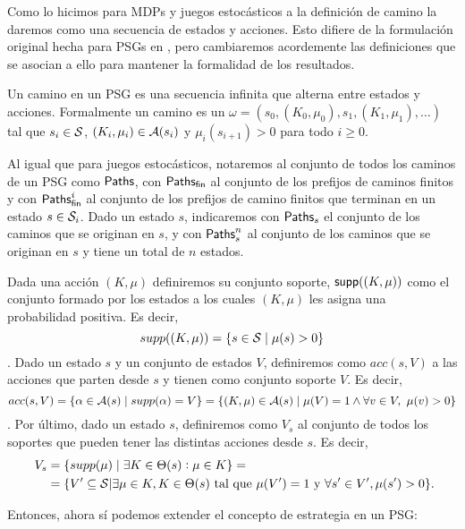 Como lo hicimos para MDPs y juegos estocásticos a la definición de camino la
daremos como una secuencia de estados y acciones. Esto difiere de la
formulación original hecha para PSGs en \cite{Polytopal}, pero cambiaremos
acordemente las definiciones que se asocian a ello para mantener la formalidad
de los resultados.

\begin{definition}
	Un camino en un PSG es una secuencia infinita que alterna entre estados y acciones. Formalmente un camino es un $\omega = (s_0, (K_0, \mu_0), s_1, (K_1, \mu_1), \dots)$ tal que $s_i \in \mathcal{S}$, $(K_i, \mu_i) \in \mathcal{A}(s_i)$ y $\mu_i(s_{i+1}) > 0$ para todo $i \geq 0$.

	Al igual que para juegos estocásticos, notaremos al conjunto de todos los
	caminos de un PSG como $\textsf{Paths}$, con $\textsf{Paths}_\textsf{fin}$ al conjunto de los prefijos de
	caminos finitos y con $\textsf{Paths}_\textsf{fin}^i$ al conjunto de los prefijos de camino
	finitos que terminan en un estado $s \in \mathcal{S}_i$. Dado un estado $s$,
	indicaremos con $\textsf{Paths}_s$ el conjunto de los caminos que se originan en $s$, y
	con $\textsf{Paths}_s^n$ al conjunto de los caminos que se originan en $s$ y tiene un
	total de $n$ estados.
\end{definition}

\begin{definition}
	Dada una acción $(K, \mu)$ definiremos su conjunto soporte, $\textsf{supp}((K, \mu))$ como el conjunto formado por los estados a los cuales $(K, \mu)$ les asigna una probabilidad positiva. Es decir,
	$$supp((K, \mu)) = \{s \in \mathcal{S} \mid \mu(s) > 0\}$$.
	Dado un estado $s$ y un conjunto de estados $V$, definiremos como $acc(s, V)$ a
	las acciones que parten desde $s$ y tienen como conjunto soporte $V$. Es decir,
	$$acc(s, V) = \{\alpha \in \mathcal{A}(s) \mid supp(\alpha) = V\} = \{(K, \mu) \in \mathcal{A}(s) \mid \mu(V) = 1 \wedge \forall v \in V, \ \mu(v) > 0\}$$.
	Por último, dado un estado $s$, definiremos como $V_s$ al conjunto de todos los
	soportes que pueden tener las distintas acciones desde $s$. Es decir,
	\begin{align*}~\label{definicionVs}
		V_s &= \{supp(\mu) \mid \exists K \in \Theta(s): \mu \in K\} = \\
		&= \{V' \subseteq \mathcal{S} | \exists \mu \in K, K \in \Theta(s) \text{ tal que } \mu(V') = 1 \text{ y } \forall s' \in V', \mu(s') > 0\}.
	\end{align*}
\end{definition}

Entonces, ahora sí podemos extender el concepto de estrategia en un PSG:

